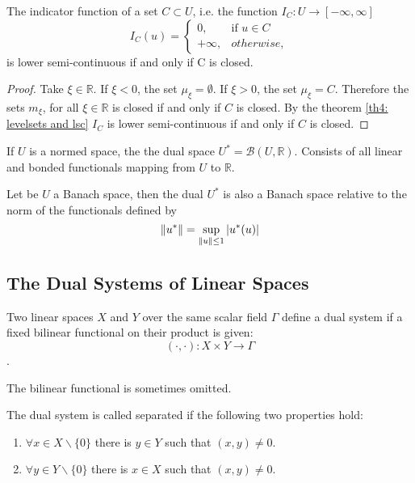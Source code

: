 \begin{example}
The indicator function of a set $C \subset U$, i.e. the function $I_C: U\rightarrow[-\infty, \infty]$
\begin{equation*}
I_C(u)=
\left\lbrace
	\begin{array}{rl}
	0, & \text{if } u \in C \\
	+\infty, & otherwise,
	\end{array}
\right.
\end{equation*}
is lower semi-continuous if and only if C is closed. 
\begin{proof}
	Take $\xi \in \mathbb{R}$.  If $\xi < 0$, the set $\mu_\xi=\emptyset$. If $\xi >0$, the set $\mu_\xi = C$. Therefore the sets $m_\xi$, for all $\xi \in \mathbb{R}$ is closed if and only if $C$ is closed. By the theorem \ref{th4: levelsets and lsc} $I_C$ is lower semi-continuous if and only if $C$ is closed.
\end{proof}
\end{example}

\begin{definition}
	If $U$ is a normed space, the the dual space $U^*=\mathcal{B}(U, \mathbb{R})$. Consists of all linear and bonded functionals mapping from $U$ to $\mathbb{R}$.
\end{definition}
\begin{theorem}
	Let be $U$ a Banach space, then the dual $U^*$ is also a Banach space relative to the norm of the functionals defined by \[\left\lVert u^*\right\rVert=\sup_{\left\lVert u\right\rVert\leq 1} \left|u^*(u)\right|\]
\end{theorem}


\subsection{The Dual Systems of Linear Spaces} 
Two linear spaces $X$ and $Y$ over the same scalar field $\Gamma$ define a dual system if a
fixed bilinear functional on their product is given:
\[(\cdot, \cdot) : X \times Y \rightarrow \Gamma\].

The bilinear functional is sometimes omitted. 

The dual system is called separated if the following two properties hold:
\begin{enumerate}
	\item $\forall x \in X \backslash \{0\}$ there is $y \in Y$ such that $(x, y) \neq 0$.
	\item $\forall y \in Y \backslash \{0\}$ there is $x \in X$ such that $(x, y) \neq 0$. 
\end{enumerate}


